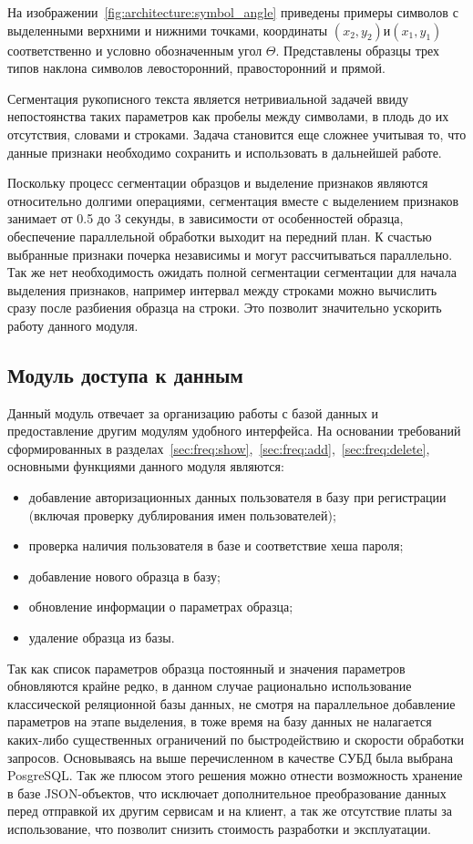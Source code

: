 На изображении~\ref{fig:architecture:symbol_angle} приведены примеры символов с выделенными верхними и нижними точками, координаты $ (x_2, y_2) и (x_1, y_1) $ соответственно и условно обозначенным угол $ \Theta $. Представлены образцы трех типов наклона символов левосторонний, правосторонний и прямой.

Сегментация рукописного текста является нетривиальной задачей ввиду непостоянства таких параметров как пробелы между символами, в плодь до их отсутствия, словами и строками. Задача становится еще сложнее учитывая то, что данные признаки необходимо сохранить и использовать в дальнейшей работе.

Поскольку процесс сегментации образцов и выделение признаков являются относительно долгими операциями, сегментация вместе с выделением признаков занимает от 0.5 до 3 секунды, в зависимости от особенностей образца, обеспечение параллельной обработки выходит на передний план. К счастью выбранные признаки почерка независимы и могут рассчитываться параллельно. Так же нет необходимость ожидать полной сегментации сегментации для начала выделения признаков, например интервал между строками можно вычислить сразу после разбиения образца на строки. Это позволит значительно ускорить работу данного модуля.

\subsection{Модуль доступа к данным}
Данный модуль отвечает за организацию работы с базой данных и предоставление другим модулям удобного интерфейса.
На основании требований сформированных в разделах~\ref{sec:freq:show},~\ref{sec:freq:add},~\ref{sec:freq:delete}, основными функциями данного модуля являются:
\begin{itemize}
  \item добавление авторизационных данных пользователя в базу при регистрации (включая проверку дублирования имен пользователей);
  \item проверка наличия пользователя в базе и соответствие хеша пароля;
  \item добавление нового образца в базу;
  \item обновление информации о параметрах образца;
  \item удаление образца из базы.
\end{itemize}

Так как список параметров образца постоянный и значения параметров обновляются крайне редко, в данном случае рационально использование классической реляционной базы данных, не смотря на параллельное добавление параметров на этапе выделения, в тоже время на базу данных не налагается каких-либо существенных ограничений по быстродействию и скорости обработки запросов. Основываясь на выше перечисленном в качестве СУБД была выбрана PosgreSQL.
Так же плюсом этого решения можно отнести возможность хранение в базе JSON-объектов, что исключает дополнительное преобразование данных перед отправкой их другим сервисам и на клиент, а так же отсутствие платы за использование, что позволит снизить стоимость разработки и эксплуатации.

